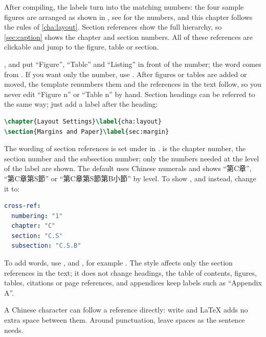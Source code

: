 After compiling, the labels turn into the matching numbers: the four sample figures are arranged as shown in , see  for the numbers, and this chapter follows the rules of \ref{cha:layout}. Section references show the full hierarchy, so \ref{sec:caption} shows the chapter and section numbers. All of these references are clickable and jump to the figure, table or section.

\code{\figref}, \code{\tblref} and \code{\lstref} put ``Figure'', ``Table'' and ``Listing'' in front of the number; the word comes from . If you want only the number, use \code{\ref}. After figures or tables are added or moved, the template renumbers them and the references in the text follow, so you never edit ``Figure n'' or ``Table n'' by hand. Section headings can be referred to the same way; just add a label after the heading:

\begin{lstlisting}[language=latex]
\chapter{Layout Settings}\label{cha:layout}
\section{Margins and Paper}\label{sec:margin}
\end{lstlisting}

The wording of section references is set under  in .  is the chapter number,  the section number and  the subsection number; only the numbers needed at the level of the label are shown. The default uses Chinese numerals and shows ``第C章'', ``第C章第S節'' or ``第C章第S節第B小節'' by level. To show ,  and  instead, change it to:

\begin{lstlisting}[language=yaml]
cross-ref:
  numbering: "1"
  chapter: "C"
  section: "C.S"
  subsection: "C.S.B"
\end{lstlisting}

To add words, use ,  and , for example . The style affects only the section references in the text; it does not change headings, the table of contents, figures, tables, citations or page references, and appendices keep labels such as ``Appendix A''.

A Chinese character can follow a reference directly: write  and \LaTeX{} adds no extra space between them. Around punctuation, leave spaces as the sentence needs.

